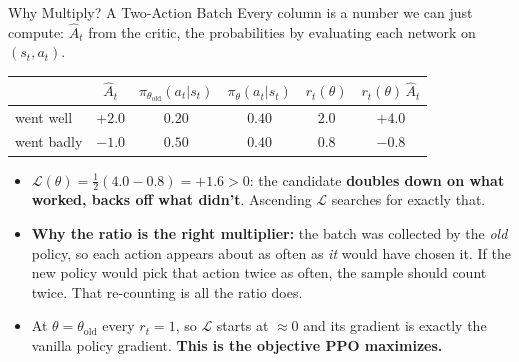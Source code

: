 \begin{frame}{Why Multiply? A Two-Action Batch}
Every column is a number we can just compute: $\hat{A}_t$ from the critic, the probabilities by evaluating each network on $(s_t,a_t)$.
\begin{center}
\small
\begin{tabular}{lccccc}
\hline
 & $\hat{A}_t$ & $\pi_{\theta_\text{old}}(a_t|s_t)$ & $\pi_\theta(a_t|s_t)$ & $r_t(\theta)$ & $r_t(\theta)\,\hat{A}_t$ \\
\hline
went well      & $+2.0$ & $0.20$ & $0.40$ & $2.0$ & $+4.0$ \\
went badly     & $-1.0$ & $0.50$ & $0.40$ & $0.8$ & $-0.8$ \\
\hline
\end{tabular}
\end{center}
\begin{itemize}
    \item $\mathcal{L}(\theta) = \tfrac{1}{2}(4.0 - 0.8) = +1.6 > 0$: the candidate \textbf{doubles down on what worked, backs off what didn't}. Ascending $\mathcal{L}$ searches for exactly that.
    \pause
    \item \textbf{Why the ratio is the right multiplier:} the batch was collected by the \emph{old} policy, so each action appears about as often as \emph{it} would have chosen it. If the new policy would pick that action twice as often, the sample should count twice. That re-counting is all the ratio does.
    \pause
    \item At $\theta = \theta_\text{old}$ every $r_t = 1$, so $\mathcal{L}$ starts at $\approx 0$ and its gradient is exactly the vanilla policy gradient. \textbf{This is the objective PPO maximizes.}
\end{itemize}
\end{frame}

